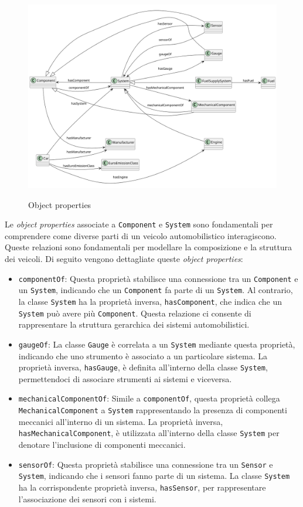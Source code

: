 \begin{figure}[H]
    \caption{Object properties}
    \includegraphics[width=\textwidth]{figures/carpedia-object-properties.png}
    \label{fig:carpedia-object-properties}
\end{figure}

Le \textit{object properties} associate a \texttt{Component} e \texttt{System} sono fondamentali per comprendere come diverse parti di un veicolo automobilistico interagiscono. Queste relazioni sono fondamentali per modellare la composizione e la struttura dei veicoli. Di seguito vengono dettagliate queste \textit{object properties}:

\begin{itemize}
    \item \texttt{componentOf}: Questa proprietà stabilisce una connessione tra un \texttt{Component} e un \texttt{System}, indicando che un \texttt{Component} fa parte di un \texttt{System}. Al contrario, la classe \texttt{System} ha la proprietà inversa, \texttt{hasComponent}, che indica che un \texttt{System} può avere più \texttt{Component}. Questa relazione ci consente di rappresentare la struttura gerarchica dei sistemi automobilistici.
    \item \texttt{gaugeOf}: La classe \texttt{Gauge} è correlata a un \texttt{System} mediante questa proprietà, indicando che uno strumento è associato a un particolare sistema. La proprietà inversa, \texttt{hasGauge}, è definita all'interno della classe \texttt{System}, permettendoci di associare strumenti ai sistemi e viceversa.
    \item \texttt{mechanicalComponentOf}: Simile a \texttt{componentOf}, questa proprietà collega \texttt{MechanicalComponent} a \texttt{System} rappresentando la presenza di componenti meccanici all'interno di un sistema. La proprietà inversa, \texttt{hasMechanicalComponent}, è utilizzata all'interno della classe \texttt{System} per denotare l'inclusione di componenti meccanici.
    \item \texttt{sensorOf}: Questa proprietà stabilisce una connessione tra un \texttt{Sensor} e \texttt{System}, indicando che i sensori fanno parte di un sistema. La classe \texttt{System} ha la corrispondente proprietà inversa, \texttt{hasSensor}, per rappresentare l'associazione dei sensori con i sistemi.
\end{itemize}

